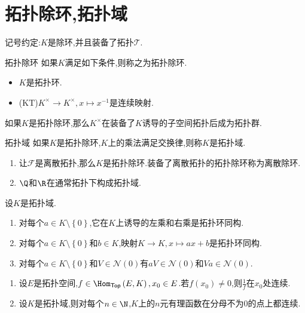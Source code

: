 \section{拓扑除环,拓扑域}


记号约定:$K$是除环,并且装备了拓扑$\mathscr{T}$.

\begin{definition}{拓扑除环}{}
	如果$K$满足如下条件,则称之为拓扑除环.
	\begin{itemize}
		\item $K$是拓扑环.
		\item ($\mathrm{KT}$)$K^{\times}\to K^{\times},x\mapsto x^{-1}$是连续映射.
	\end{itemize}
\end{definition}

\begin{remark}{}{}
	如果$K$是拓扑除环,那么$K^{\times}$在装备了$K$诱导的子空间拓扑后成为拓扑群.
\end{remark}

\begin{definition}{拓扑域}{}
	如果$K$是拓扑除环,$K$上的乘法满足交换律,则称$K$是拓扑域.
\end{definition}

\begin{example}{}{}
	\begin{enumerate}
		\item 让$\mathscr{F}$是离散拓扑,那么$K$是拓扑除环.装备了离散拓扑的拓扑除环称为离散除环.
		\item $\Q$和$\R$在通常拓扑下构成拓扑域.
	\end{enumerate}
\end{example}

\begin{proposition}{}{}
	设$K$是拓扑域.
	\begin{enumerate}
		\item 对每个$a\in K\setminus\left\{0\right\}$,它在$K$上诱导的左乘和右乘是拓扑环同构.
		\item 对每个$a\in K\setminus\left\{0\right\}$和$b\in K$,映射$K\to K,x\mapsto ax+b$是拓扑环同构.
		\item 对每个$a\in K\setminus\left\{0\right\}$和$V\in\mathcal{N}\left(0\right)$有$aV\in\mathcal{N}\left(0\right)$和$Va\in\mathcal{N}\left(0\right)$.
	\end{enumerate}
\end{proposition}

\begin{proposition}{}{}
	\begin{enumerate}
		\item 设$E$是拓扑空间,$f\in\Hom_{\mathsf{Top}}\left(E,K\right),x_{0}\in E$.若$f\left(x_{0}\right)\neq 0$,则$\frac{1}{f}$在$x_{0}$处连续.
		\item 设$K$是拓扑域,则对每个$n\in\N$,$K$上的$n$元有理函数在分母不为$0$的点上都连续.
	\end{enumerate}
\end{proposition}

